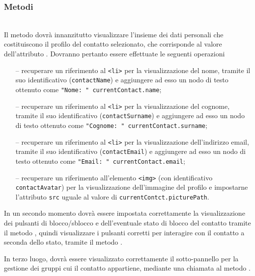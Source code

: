 \subsubsection*{Metodi}
\begin{description}

  \item{}\\
  Il metodo dovrà innanzitutto visualizzare l'insieme dei dati personali che costituiscono il profilo del contatto selezionato, che corrisponde al valore dell'attributo . Dovranno pertanto essere effettuate le seguenti operazioni
  \begin{itemize}
    \item[--] recuperare un riferimento al \verb'<li>' per la visualizzazione del nome, tramite il suo identificativo (\verb'contactName') e aggiungere ad esso un nodo di testo ottenuto come \verb'"Nome: " currentContact.name';
    \item[--] recuperare un riferimento al \verb'<li>' per la visualizzazione del cognome, tramite il suo identificativo (\verb'contactSurname') e aggiungere ad esso un nodo di testo ottenuto come \verb'"Cognome: " currentContact.surname';
    \item[--] recuperare un riferimento al \verb'<li>' per la visualizzazione dell'indirizzo email, tramite il suo identificativo (\verb'contactEmail') e aggiungere ad esso un nodo di testo ottenuto come \verb'"Email: " currentContact.email';
    \item[--] recuperare un riferimento all'elemento \verb'<img>' (con identificativo \verb'contactAvatar') per la visualizzazione dell'immagine del profilo e impostarne l'attributo \verb'src' uguale al valore di \verb'currentContct.picturePath'.
  \end{itemize}
  
  In un secondo momento dovrà essere impostata correttamente la visualizzazione dei pulsanti di blocco/sblocco e dell'eventuale stato di blocco del contatto tramite il metodo , quindi visualizzare i pulsanti corretti per interagire con il contatto a seconda dello stato, tramite il metodo .
  
  In terzo luogo, dovrà essere visualizzato correttamente il sotto-pannello per la gestione dei gruppi cui il contatto appartiene, mediante una chiamata al metodo .
  

\end{description}
